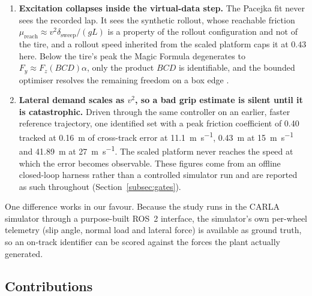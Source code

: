 \begin{enumerate}
\item \textbf{Excitation collapses inside the virtual-data step.} The Pacejka
fit never sees the recorded lap. It sees the synthetic rollout, whose reachable
friction $\mu_{\mathrm{reach}}\!\approx\!v^{2}\delta_{\mathrm{sweep}}/(gL)$ is a
property of the rollout configuration and not of the tire, and a rollout speed
inherited from the scaled platform caps it at $0.43$ here. Below the tire's
peak the Magic Formula degenerates to $F_{y}\approx F_{z}(BCD)\alpha$, only
the product $BCD$ is identifiable, and the bounded optimiser resolves the
remaining freedom on a box edge \cite{ljung1999sysid,pacejka2012book}.

\item \textbf{Lateral demand scales as $v^{2}$, so a bad grip estimate is
silent until it is catastrophic.} Driven through the same controller on an
earlier, faster reference trajectory, one identified set with a peak friction
coefficient of \num{0.40} tracked at \SI{0.16}{\meter} of cross-track error at
\SI{11.1}{\meter\per\second}, \SI{0.43}{\meter} at
\SI{15}{\meter\per\second} and \SI{41.89}{\meter} at
\SI{27}{\meter\per\second}. The scaled platform never reaches the speed at
which the error becomes observable. These figures come from an offline
closed-loop harness rather than a controlled simulator run and are reported as
such throughout (Section~\ref{subsec:gates}).
\end{enumerate}

One difference works in our favour. Because the study runs in the CARLA
simulator \cite{carla2017} through a purpose-built ROS~2 interface, the
simulator's own per-wheel telemetry (slip angle, normal load and lateral force)
is available as ground truth, so an on-track identifier can be scored against
the forces the plant actually generated.

\subsection{Contributions}

